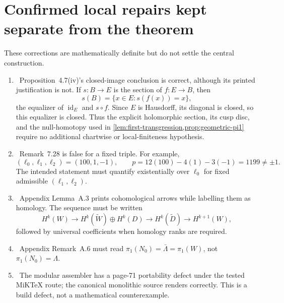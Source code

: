 \section{Confirmed local repairs kept separate from the theorem}

These corrections are mathematically definite but do not settle the central construction.

\begin{enumerate}[leftmargin=2em]
\item \Verified\ Proposition~4.7(iv)'s closed-image conclusion is correct,
although its printed justification is not.  If \(s:B\to E\) is the section
of \(f:E\to B\), then
\[
 s(B)=\{x\in E:s(f(x))=x\},
\]
the equalizer of \(\operatorname{id}_E\) and \(s\circ f\).  Since \(E\) is
Hausdorff, its diagonal is closed, so this equalizer is closed.  Thus the
explicit holomorphic section, its cusp disc, and the null-homotopy used in
\cref{lem:first-transgression,prop:geometric-pi1} require no additional
chartwise or local-finiteness hypothesis.
\item \Refuted\ Remark~7.28 is false for a fixed triple. For example,
\[
(\ell_0,\ell_1,\ell_2)=(100,1,-1),\qquad
p=12(100)-4(1)-3(-1)=1199\ne\pm1.
\]
The intended statement must quantify existentially over $\ell_0$ for fixed admissible $(\ell_1,\ell_2)$.
\item \Verified\ Appendix Lemma~A.3 prints cohomological arrows while labelling them as homology. The sequence must be written
\[
H^k(W)\longrightarrow H^k(\widetilde W)\oplus H^k(D)
\longrightarrow H^k(\widetilde D)\longrightarrow H^{k+1}(W),
\]
followed by universal coefficients when homology ranks are required.
\item \Verified\ Appendix Remark~A.6 must read $\pi_1(N_0)=\bar\Lambda=\pi_1(W)$, not $\pi_1(N_0)=\Lambda$.
\item \Verified\ The modular assembler has a page-71 portability defect under the tested MiK\TeX{} route; the canonical monolithic source renders correctly. This is a build defect, not a mathematical counterexample.
\end{enumerate}
